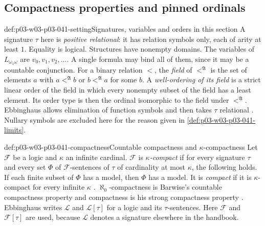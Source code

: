 \subsection{Compactness properties and pinned ordinals}
\label{sec:p03-w03-p03-041-definitions}

\begin{hbconvention}{def:p03-w03-p03-041-setting}{Signatures, variables and orders in this section}
A signature \(\tau\) here is \emph{positive relational}: it has relation
symbols only, each of arity at least \(1\). Equality is logical.
Structures have nonempty domains. The variables of \(L_{\omega_1\omega}\)
are \(v_0,v_1,v_2,\ldots\). A single formula may bind all of them, since
it may be a countable conjunction. For a binary relation \(<\), the
\emph{field} of \(<^{\mathfrak A}\) is the set of elements \(a\) with
\(a<^{\mathfrak A}b\) or \(b<^{\mathfrak A}a\) for some \(b\). A
\emph{well-ordering of its field} is a strict linear order of the field in
which every nonempty subset of the field has a least element. Its order
type is then the ordinal isomorphic to the field under \(<^{\mathfrak A}\).
Ebbinghaus allows elimination of function symbols and then takes \(\tau\)
relational \cite[Ch.~II, p.~62]{Ebbinghaus1985ExtendedLogics}. Nullary
symbols are excluded here for the reason given in
\cref{def:p03-w03-p03-041-limits}.
\end{hbconvention}

\begin{hbdefinition}{def:p03-w03-p03-041-compactness}{Countable compactness and \(\kappa\)-compactness}
Let \(\mathcal F\) be a logic and \(\kappa\) an infinite cardinal.
\(\mathcal F\) is \emph{\(\kappa\)-compact} if for every signature
\(\tau\) and every set \(\Phi\) of \(\mathcal F\)-sentences of \(\tau\)
of cardinality at most \(\kappa\), the following holds. If each finite
subset of \(\Phi\) has a model, then \(\Phi\) has a model. It is
\emph{compact} if it is \(\kappa\)-compact for every infinite \(\kappa\)
\cite[Ch.~II, Definition~1.2.4(i)--(ii), p.~31]{Ebbinghaus1985ExtendedLogics}.
\(\aleph_0\)-compactness is Barwise's countable compactness property and
compactness is his strong compactness property
\cite[Ch.~I, \S1.4, p.~7]{Barwise1985BackgroundAims}. Ebbinghaus writes
\(\mathscr L\) and \(\mathscr L[\tau]\) for a logic and its
\(\tau\)-sentences. Here \(\mathcal F\) and \(\mathcal F[\tau]\) are used,
because \(\mathcal L\) denotes a signature elsewhere in the handbook.
\end{hbdefinition}

